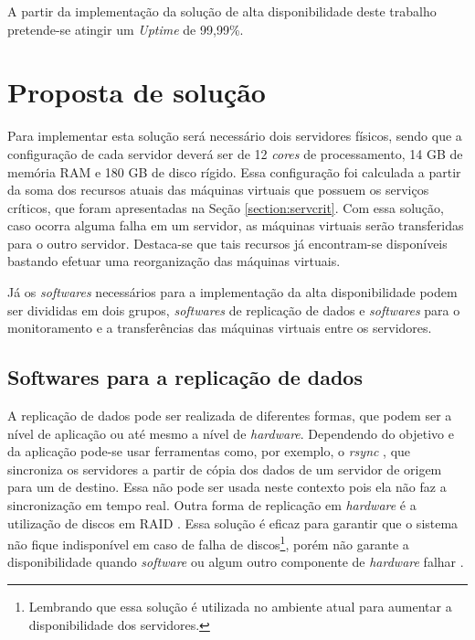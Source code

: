 A partir da implementação da solução de alta disponibilidade deste trabalho pretende-se atingir um \textit{Uptime} de 99,99\%.

\section{Proposta de solução}
\label{section:propostasolucao}

Para implementar esta solução será necessário dois servidores físicos, sendo que a configuração de cada servidor deverá ser de 
12 \textit{cores} de processamento, 14 GB de memória \ac{RAM} e 180 GB de disco rígido. Essa configuração foi calculada a partir da soma dos 
recursos atuais das máquinas virtuais que possuem os serviços críticos, que foram apresentadas na Seção \ref{section:servcrit}.
Com essa solução, caso ocorra alguma falha em um servidor, as máquinas virtuais serão transferidas para o outro servidor.
Destaca-se que tais recursos já encontram-se disponíveis bastando efetuar uma reorganização das máquinas virtuais.

Já os \textit{softwares} necessários para a implementação da alta disponibilidade podem ser divididas em dois grupos, \textit{softwares} de 
replicação de dados e \textit{softwares} para o monitoramento e a transferências das máquinas virtuais entre os servidores.

\subsection{Softwares para a replicação de dados}
\label{section:toolrepl}

A replicação de dados pode ser realizada de diferentes formas, que podem ser a nível de aplicação ou até mesmo a nível de \textit{hardware}.
Dependendo do objetivo e da aplicação pode-se usar ferramentas como, por exemplo, o \textit{rsync} \cite{rsync}, que sincroniza os servidores 
a partir de cópia dos dados de um servidor de origem para um de destino. Essa não pode ser usada neste contexto pois ela não faz a sincronização 
em tempo real. Outra forma de replicação em \textit{hardware} é a utilização de discos em \ac{RAID} \cite{raid}. Essa solução é eficaz para 
garantir que o sistema não fique indisponível em caso de falha de discos\footnote[2]{Lembrando que essa solução é utilizada no ambiente atual 
para aumentar a disponibilidade dos servidores.}, porém não garante a disponibilidade quando \textit{software} ou algum outro componente de 
\textit{hardware} falhar \cite{zaminhani2008}.

